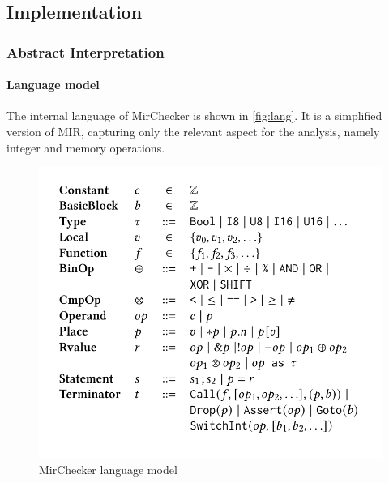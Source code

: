 \documentclass{article}
\begin{document}
\subsection{Implementation}

\subsubsection{Abstract Interpretation}
\paragraph{Language model}
The internal language of MirChecker is shown in \autoref{fig:lang}. It is a simplified version of 
MIR, capturing only the relevant aspect for the analysis, namely integer and memory operations. 
\begin{figure}[h]
    \includegraphics[scale=0.3]{lang.png}
    \caption{MirChecker language model}
    \label{fig:lang}
\end{figure}
\end{document}
